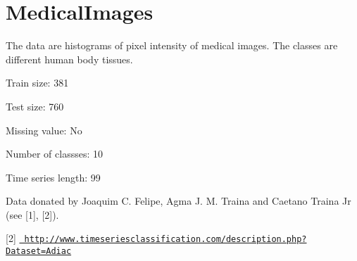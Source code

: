 \chapter{Medical\+Images}
\hypertarget{md_external_2data_2UCRArchive__2018_2MedicalImages_2README}{}\label{md_external_2data_2UCRArchive__2018_2MedicalImages_2README}
\label{md_external_2data_2UCRArchive__2018_2MedicalImages_2README_autotoc_md138}%
%
 The data are histograms of pixel intensity of medical images. The classes are different human body tissues.

Train size\+: 381

Test size\+: 760

Missing value\+: No

Number of classses\+: 10

Time series length\+: 99

Data donated by Joaquim C. Felipe, Agma J. M. Traina and Caetano Traina Jr (see \mbox{[}1\mbox{]}, \mbox{[}2\mbox{]}).

\mbox{[}2\mbox{]} \href{http://www.timeseriesclassification.com/description.php?Dataset=Adiac}{\texttt{ http\+://www.\+timeseriesclassification.\+com/description.\+php?\+Dataset=\+Adiac}} 